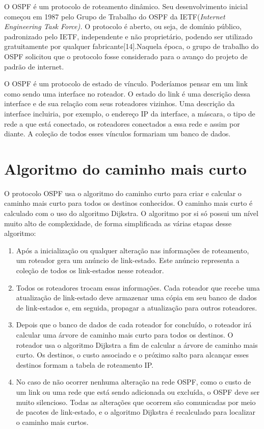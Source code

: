 \documentclass[12pt,a4paper]{report}
\begin{document}
O OSPF \'e um protocolo de roteamento din\^amico. Seu desenvolvimento inicial come\c{c}ou em 1987 pelo Grupo de Trabalho do OSPF da IETF(\textit{Internet Engineering Task Force).} O protocolo \'e aberto, ou seja, de dom\'inio p\'ublico, padronizado pelo IETF, independente e n\~ao propriet\'ario, podendo ser utilizado gratuitamente por qualquer fabricante[14].Naquela \'epoca, o grupo de trabalho do OSPF solicitou que o protocolo fosse considerado para o avan\c{c}o do projeto de padr\~ao de internet.

O OSPF \'e um protocolo de estado de v\'inculo. Poder\'iamos pensar em um link como sendo uma interface no roteador. O estado do link \'e uma descri\c{c}\~ao dessa interface e de sua rela\c{c}\~ao com seus roteadores vizinhos. Uma descri\c{c}\~ao da interface incluiria, por exemplo, o endere\c{c}o IP da interface, a m\'ascara, o tipo de rede a que est\'a conectado, os roteadores conectados a essa rede e assim por diante. A cole\c{c}\~ao de todos esses v\'inculos formariam um banco de dados.

\section{Algoritmo do caminho mais curto}

O protocolo OSPF usa o algoritmo do caminho curto para criar e calcular o caminho mais curto para todos os destinos conhecidos. O caminho mais curto \'e calculado com o uso do algoritmo Dijkstra. O algoritmo por si s\'o possui um n\'ivel muito alto de complexidade, de forma simplificada as v\'arias etapas desse algoritmo:

\begin{enumerate}
\item Ap\'os a inicializa\c{c}\~ao ou qualquer altera\c{c}\~ao nas informa\c{c}\~oes de roteamento, um roteador gera um an\'uncio de link-estado. Este an\'uncio representa a cole\c{c}\~ao de todos os link-estados nesse roteador.
\item Todos os roteadores trocam essas informa\c{c}\~oes. Cada roteador que recebe uma atualiza\c{c}\~ao de link-estado deve armazenar uma c\'opia em seu banco de dados de link-estados e, em seguida, propagar a atualiza\c{c}\~ao para outros roteadores.
\item Depois que o banco de dados de cada roteador for conclu\'ido, o roteador ir\'a calcular uma \'arvore de caminho mais curto para todos os destinos. O roteador usa o algoritmo Dijkstra a fim de calcular a \'arvore de caminho mais curto. Os destinos, o custo associado e o pr\'oximo salto para alcan\c{c}ar esses destinos formam a tabela de roteamento IP.
\item No caso de n\~ao ocorrer nenhuma altera\c{c}\~ao na rede OSPF, como o custo de um link ou uma rede que est\'a sendo adicionada ou exclu\'ida, o OSPF deve ser muito silencioso. Todas as altera\c{c}\~oes que ocorrem s\~ao comunicadas por meio de pacotes de link-estado, e o algoritmo Dijkstra \'e recalculado para localizar o caminho mais curtos.

\end{enumerate}
\end{document}
